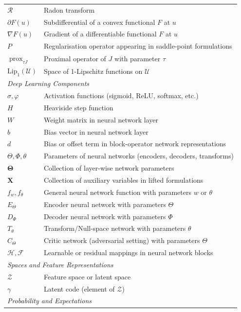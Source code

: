 \begin{longtable}{p{3cm} p{10cm}}
$\mathcal{R}$ & Radon transform \\
$\partial F(u)$ & Subdifferential of a convex functional $F$ at $u$ \\
$\nabla F(u)$ & Gradient of a differentiable functional $F$ at $u$ \\
$P$ & Regularisation operator appearing in saddle-point formulations \\
$\operatorname{prox}_{\tau J}$ & Proximal operator of $J$ with parameter $\tau$ \\
$\text{Lip}_1(\mathcal{U})$ & Space of 1-Lipschitz functions on $\mathcal{U}$ \\
\hline
\multicolumn{2}{l}{\textit{Deep Learning Components}} \\
$\sigma, \varphi$ & Activation functions (sigmoid, ReLU, softmax, etc.) \\
$H$ & Heaviside step function \\
$W$ & Weight matrix in neural network layer \\
$b$ & Bias vector in neural network layer \\
$d$ & Bias or offset term in block-operator network representations \\
$\Theta, \Phi, \theta$ & Parameters of neural networks (encoders, decoders, transforms) \\
$\mathbf{\Theta}$ & Collection of layer-wise network parameters \\
$\mathbf{X}$ & Collection of auxiliary variables in lifted formulations \\
$f_w, f_\theta$ & General neural network function with parameters $w$ or $\theta$ \\
$E_\Theta$ & Encoder neural network with parameters $\Theta$ \\
$D_\Phi$ & Decoder neural network with parameters $\Phi$ \\
$T_\theta$ & Transform/Null-space network with parameters $\theta$ \\
$C_\Theta$ & Critic network (adversarial setting) with parameters $\Theta$ \\
$\mathcal{H}, \mathcal{F}$ & Learnable or residual mappings in neural network blocks \\
\hline
\multicolumn{2}{l}{\textit{Spaces and Feature Representations}} \\
$\mathcal{Z}$ & Feature space or latent space \\
$\gamma$ & Latent code (element of $\mathcal{Z}$) \\
\hline
\multicolumn{2}{l}{\textit{Probability and Expectations}} \\

\end{longtable}
